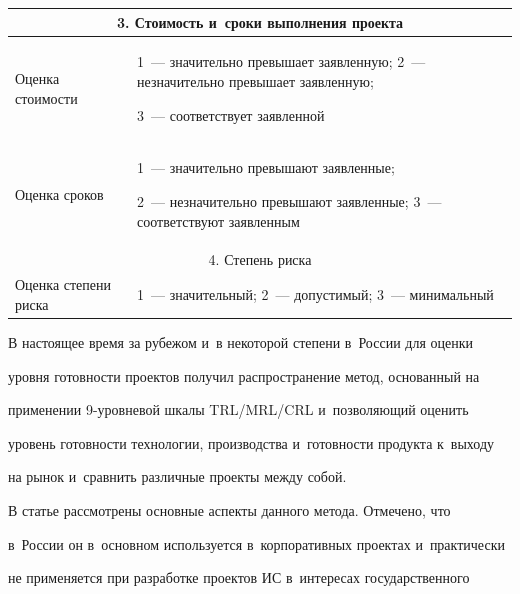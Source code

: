 \begin{table}
\begin{center}
\begin{tabular}{|p{40mm}|p{68mm}|}
\hline

\multicolumn{2}{|c|}{3. Стоимость и~сроки выполнения проекта}\\

\hline

Оценка стоимости&1~--- значительно превышает заявленную; 2~--- незначительно превышает заявленную; 

3~--- соответствует заявленной\\

\hline

Оценка сроков&1~--- значительно превышают заявленные; 

2~--- незначительно превышают заявленные; 3~--- соответствуют заявленным\\

\hline

\multicolumn{2}{|c|}{4. Степень риска}\\

\hline

Оценка степени риска&1~--- значительный; 2~--- допустимый; 3~--- минимальный\\

\hline

\end{tabular}

\end{center}

\vspace*{-12pt}

\end{table}



  

  В настоящее время за рубежом и~в некоторой степени в~России для оценки 

уровня готовности проектов получил распространение метод, основанный на 

применении 9-уров\-не\-вой шкалы TRL\!/\!MRL\!/\!CRL и~позволяющий оценить 

уровень готовности технологии, производства и~готовности продукта к~выходу 

на рынок и~сравнить различные проекты между собой.

  

  В статье рассмотрены основные аспекты данного метода. Отмечено, что 

в~России он в~основном используется в~корпоративных проектах и~практически 

не применяется при разработке проектов ИС в~интересах государственного 

